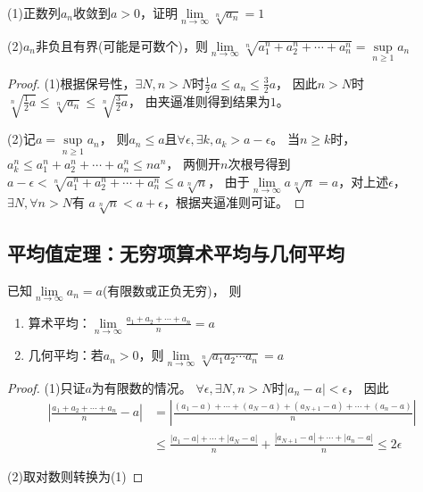 \begin{exercise}[根号平均的两个经典推广]
  (1)正数列$a_n$收敛到$a > 0$，证明$\lim \limits _{n \rightarrow \infty} \sqrt[n]{a_n} = 1$

  (2)$a_n$非负且有界(可能是可数个)，则$\lim \limits _{n \rightarrow \infty} \sqrt[n]{a_1^n + a_2^n + \cdots + a_n^n} = \sup \limits_{n \geq 1}a_n$
\end{exercise}

\begin{proof}
  (1)根据保号性，$\exists N, n > N$时$\frac{1}{2}a \leq a_n \leq \frac{3}{2}a$，
  因此$n > N$时$\sqrt[n]{\frac{1}{2}a} \leq \sqrt[n]{a_n} \leq \sqrt[n]{\frac{3}{2}a}$，
  由夹逼准则得到结果为$1$。

  (2)记$a = \sup \limits_{n \geq 1}a_n$，
  则$a_n \leq a$且$\forall \epsilon, \exists k, a_k > a - \epsilon$。
  当$n \geq k$时，$a_k^n \leq a_1^n + a_2^n + \cdots + a_n^n \leq n a^n$，
  两侧开$n$次根号得到$a - \epsilon < \sqrt[n]{a_1^n + a_2^n + \cdots + a_n^n} \leq a \sqrt[n]{n}$，
  由于$\lim \limits _{n \rightarrow \infty} a \sqrt[n]{n} = a$，对上述$\epsilon$，$\exists N, \forall n > N$有
  $a \sqrt[n]{n} < a + \epsilon$，根据夹逼准则可证。
\end{proof}

\subsection{平均值定理：无穷项算术平均与几何平均}

\begin{theorem}[平均值定理]
  已知$\lim \limits _{n \rightarrow \infty} a_n = a$(有限数或正负无穷)，
  则
  \begin{enumerate}
  \item 算术平均：$\lim \limits _{n \rightarrow \infty} \frac{a_1 + a_2 + \cdots + a_n}{n} = a$
  \item 几何平均：若$a_n > 0$，则$\lim \limits _{n \rightarrow \infty} \sqrt[n]{a_1a_2\cdots a_n} = a$
  \end{enumerate}
\end{theorem}

\begin{proof}
  (1)只证$a$为有限数的情况。
  $\forall \epsilon, \exists N, n > N$时$|a_n - a| < \epsilon$，
  因此
  \begin{align*}
    \left| \frac{a_1 + a_2 + \cdots + a_n}{n} - a \right| &= \left| \frac{(a_1 - a) + \cdots + (a_N - a) + (a_{N+1} - a) + \cdots + (a_n - a)}{n} \right| \\
    &\leq \frac{|a_1 - a| + \cdots + |a_N - a|}{n} + \frac{|a_{N+1} - a| + \cdots + |a_n - a|}{n} \leq 2\epsilon
  \end{align*}

  (2)取对数则转换为(1)
\end{proof}

